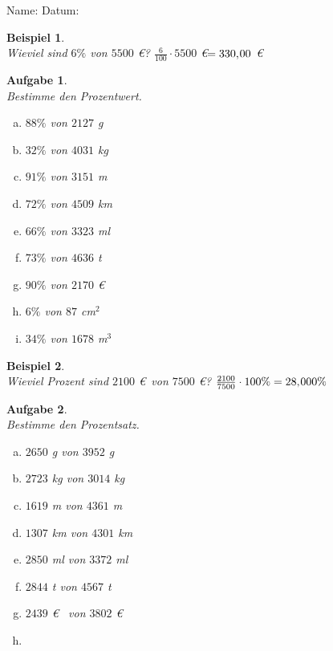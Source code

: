 \documentclass[12pt,fleqn]{article}
\theoremstyle{aufg}
\newtheorem{aufgabe}{Aufgabe}
\theoremstyle{bsp}
\newtheorem{beispiel}{Beispiel}
\begin{document}
 
    \begin{flushleft}
Name: \hspace{12cm} Datum:\begin{beispiel} ~ \\ 
Wieviel sind $6\%$ von $5500$ \euro? $\frac{6}{100}\cdot 5500$ \euro $ = 330,\hspace{-1pt}00$ \euro\end{beispiel} 
\begin{aufgabe} ~ \\ 
Bestimme den Prozentwert.\begin{multicols}{3} 
\begin{enumerate}[a)] 
\item 
$88\%$ von $2127$ g
\item 
$32\%$ von $4031$ kg
\item 
$91\%$ von $3151$ m
\item 
$72\%$ von $4509$ km
\item 
$66\%$ von $3323$ ml
\item 
$73\%$ von $4636$ t
\item 
$90\%$ von $2170$ \euro~
\item 
$6\%$ von $87$ cm$^2$
\item 
$34\%$ von $1678$ m$^3$
\end{enumerate} 
\end{multicols} 
\end{aufgabe} 
\begin{beispiel} ~ \\ 
Wieviel Prozent sind $2100$ \euro~von $7500$ \euro? $\frac{2100}{7500}\cdot 100\%  = 28,\hspace{-1pt}000\%$ \end{beispiel} 
\begin{aufgabe} ~ \\ 
Bestimme den Prozentsatz.\begin{multicols}{3} 
\begin{enumerate}[a)] 
\item 
$2650$ g von $3952$ g
\item 
$2723$ kg von $3014$ kg
\item 
$1619$ m von $4361$ m
\item 
$1307$ km von $4301$ km
\item 
$2850$ ml von $3372$ ml
\item 
$2844$ t von $4567$ t
\item 
$2439$ \euro~ von $3802$ \euro~
\item 

\end{enumerate}
\end{multicols}
\end{aufgabe}
\end{flushleft}
\end{document}
